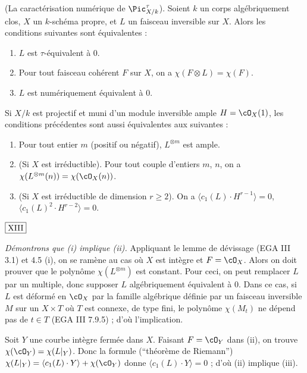\begin{thm}\label{thm:4.6} \textup{(La caractérisation numérique de $\Pic^{\tau}_{X/k}$).} Soient $k$ un corps algébriquement clos, $X$ un $k$-schéma propre, et $L$ un faisceau inversible sur $X$. Alors les conditions suivantes sont équivalentes :
\begin{enumerate}[label={\roman*)}]
\item $L$ est $\tau$-équivalent à $0$.
\item Pour tout faisceau cohérent $F$ sur $X$, on a $\chi(F \otimes L) = \chi(F)$.
\item $L$ est numériquement équivalent à $0$.
\end{enumerate}
Si $X/k$ est projectif et muni d'un module inversible ample $H = \cO_X(1)$, les conditions précédentes sont aussi équivalentes aux suivantes :
\begin{enumerate}[label={\roman*)},resume]
\item Pour tout entier $m$ (positif ou négatif), $L^{\otimes m}$ est ample.
\item (Si $X$ est irréductible). Pour tout couple d'entiers $m$, $n$, on a $\chi(L^{\otimes m}(n)) = \chi(\cO_X(n))$.
\item (Si $X$ est irréductible de dimension $r \geq 2$). On a $\langle c_1(L) \cdot H^{r-1} \rangle = 0$, $\langle c_1(L)^2 \cdot H^{r-2} \rangle = 0$.
\end{enumerate}
\end{thm}

\begin{flushright}
$\fbox{\text{XIII}}$
\end{flushright}

\noindent\textit{Démontrons que (i) implique (ii).} Appliquant le lemme de dévissage (EGA III 3.1) et 4.5 (i), on se ramène au cas où $X$ est intègre et $F = \cO_X$. Alors on doit prouver que le polynôme $\chi(L^{\otimes m})$ est constant. Pour ceci, on peut remplacer $L$ par un multiple, donc supposer $L$ algébriquement équivalent à $0$. Dans ce cas, si $L$ est déformé en $\cO_X$ par la famille algébrique définie par un faisceau inversible $M$ sur un $X \times T$ où $T$ est connexe, de type fini, le polynôme $\chi(M_t)$ ne dépend pas de $t \in T$ (EGA III 7.9.5) ; d'où l'implication.

Soit $Y$ une courbe intègre fermée dans $X$. Faisant $F = \cO_Y$ dans (ii), on trouve $\chi(\cO_Y) = \chi(L|_Y)$. Donc la formule (``théorème de Riemann'') $\chi(L|_Y) = \langle c_1(L) \cdot Y \rangle + \chi(\cO_Y)$ donne $\langle c_1(L) \cdot Y \rangle = 0$ ; d'où (ii) implique (iii).


